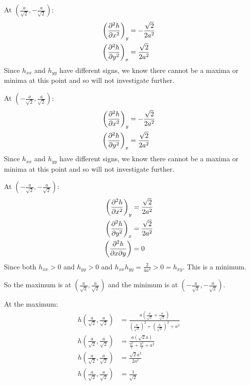 \documentclass[10pt,\jkfside,a4paper]{article}
\begin{document}
\begin{enumerate}
At $(\frac{a}{\sqrt{2}}, -\frac{a}{\sqrt{2}})$:
\begin{equation}
\begin{split}
\left(\pdv[2]{h}{x}\right)_y &= -\frac{\sqrt{2}}{2a^2} \\
\left(\pdv[2]{h}{y}\right)_x &= \frac{\sqrt{2}}{2a^2} \\
\end{split}
\end{equation}
Since $h_{xx}$ and $h_{yy}$ have different signs, we know there cannot be a maxima or minima at this point and so 
will not investigate further.

At $(-\frac{a}{\sqrt{2}}, \frac{a}{\sqrt{2}})$:
\begin{equation}
\begin{split}
\left(\pdv[2]{h}{x}\right)_y &= -\frac{\sqrt{2}}{2a^2} \\
\left(\pdv[2]{h}{y}\right)_x &= \frac{\sqrt{2}}{2a^2} \\
\end{split}
\end{equation}
Since $h_{xx}$ and $h_{yy}$ have different signs, we know there cannot be a maxima or minima at this point and so 
will not investigate further.

At $(-\frac{a}{\sqrt{2}}, -\frac{a}{\sqrt{2}})$:
\begin{equation}
\begin{split}
\left(\pdv[2]{h}{x}\right)_y &= \frac{\sqrt{2}}{2a^2} \\
\left(\pdv[2]{h}{y}\right)_x &= \frac{\sqrt{2}}{2a^2} \\
\left(\pdv[2]{h}{x}{y}\right) &= 0 \\
\end{split}
\end{equation}
Since both $h_{xx} > 0$ and $h_{yy} > 0$ and $h_{xx}h_{yy} = \frac{2}{4a^4} > 0 = h_{xy}$. This is a minimum.

So the maximum is at $(\frac{a}{\sqrt{2}}, \frac{a}{\sqrt{2}})$ and the minimum is at $(-\frac{a}{\sqrt{2}}, -\frac{a}{\sqrt{2}})$.

At the maximum: 
\begin{equation}
\begin{split}
h(\frac{a}{\sqrt{2}}, \frac{a}{\sqrt{2}}) &= \frac{a\left(\frac{a}{\sqrt{2}} + \frac{a}{\sqrt{2}}\right)}{\left(\frac{a}{\sqrt{2}}\right)^2 + \left(\frac{a}{\sqrt{2}}\right)^2 + a^2 } \\
h(\frac{a}{\sqrt{2}}, \frac{a}{\sqrt{2}}) &= \frac{a\left(\sqrt{2}a\right)}{\frac{a^2}{2} + \frac{a^2}{2} + a^2 } \\
h(\frac{a}{\sqrt{2}}, \frac{a}{\sqrt{2}}) &= \frac{\sqrt{2}a^2}{2a^2} \\
h(\frac{a}{\sqrt{2}}, \frac{a}{\sqrt{2}}) &= \frac{1}{\sqrt{2}} \\
\end{split}
\end{equation}


\end{enumerate}
\end{document}
